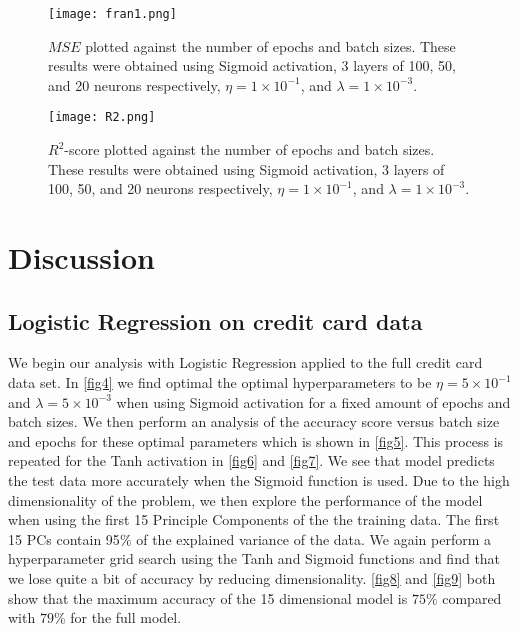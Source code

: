 \documentclass{emulateapj}
\begin{document}
\begin{figure}[H]
    \centering
    \texttt{[image: fran1.png]}
    \caption{$MSE$ plotted against the number of epochs and batch sizes. These results were obtained using Sigmoid activation, 3 layers of 100, 50, and 20 neurons respectively, $\eta = 1\times 10^{-1}$, and $\lambda = 1\times 10^{-3}$.}
    \label{fig18}
\end{figure}

\begin{figure}[H]
    \centering
    \texttt{[image: R2.png]}
    \caption{$R^2$-score plotted against the number of epochs and batch sizes. These results were obtained using Sigmoid activation, 3 layers of 100, 50, and 20 neurons respectively, $\eta = 1\times 10^{-1}$, and $\lambda = 1\times 10^{-3}$.}
    \label{fig19}
\end{figure}


\section{Discussion}
\subsection{Logistic Regression on credit card data}
We begin our analysis with Logistic Regression applied to the full credit card data set. In \ref{fig4} we find optimal the optimal hyperparameters to be $\eta = 5\times10^{-1}$ and $\lambda = 5\times10^{-3}$ when using Sigmoid activation for a fixed amount of epochs and batch sizes. We then perform an analysis of the accuracy score versus batch size and epochs for these optimal parameters which is shown in \ref{fig5}. This process is repeated for the Tanh activation in \ref{fig6} and \ref{fig7}. We see that model predicts the test data more accurately when the Sigmoid function is used. Due to the high dimensionality of the problem, we then explore the performance of the model when using the first 15 Principle Components of the the training data. The first 15 PCs contain 95$\%$ of the explained variance of the data. We again perform a hyperparameter grid search using the Tanh and Sigmoid functions and find that we lose quite a bit of accuracy by reducing dimensionality. \ref{fig8} and \ref{fig9} both show that the maximum accuracy of the 15 dimensional model is $75\%$ compared with $79\%$ for the full model.
\end{document}
